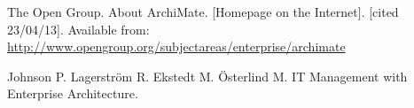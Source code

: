 \begin{thebibliography}{99}     
	
 The Open Group. About ArchiMate. [Homepage on the Internet]. [cited 23/04/13]. Available from: \url{http://www.opengroup.org/subjectareas/enterprise/archimate}

 Johnson P. Lagerstr\"om R. Ekstedt M. \"Osterlind M. IT Management with Enterprise Architecture.

\end{thebibliography}
